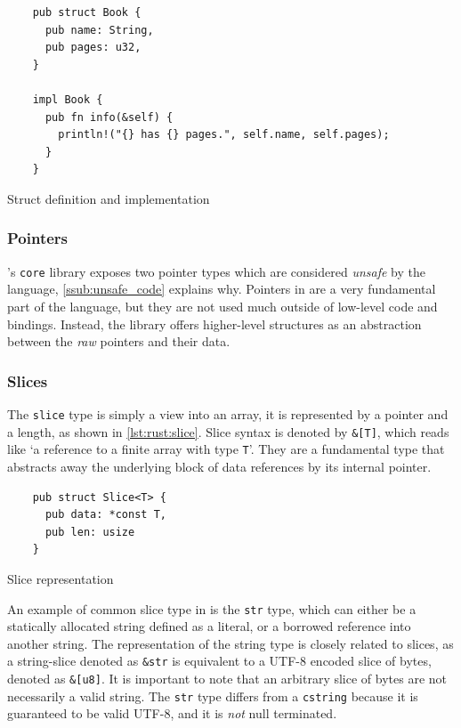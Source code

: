 \begin{listing}[H]
  \begin{verbatim}
    pub struct Book {
      pub name: String,
      pub pages: u32,
    }

    impl Book {
      pub fn info(&self) {
        println!("{} has {} pages.", self.name, self.pages);
      }
    }
  \end{verbatim}
  \caption{Struct definition and implementation}
  \label{lst:book_struct}
\end{listing}

\subsubsection{Pointers}

\rust's \texttt{core} library exposes two pointer types which are considered \textit{unsafe} by the language, \autoref{ssub:unsafe_code} explains why.
Pointers in \rust are a very fundamental part of the language, but they are not used much outside of low-level code and bindings.
Instead, the library offers higher-level structures as an abstraction between the \emph{raw} pointers and their data.

\subsubsection{Slices}

The \texttt{slice} type is simply a view into an array, it is represented by a pointer and a length, as shown in \autoref{lst:rust:slice}.
Slice syntax is denoted by \texttt{\&[T]}, which reads like `a reference to a finite array with type \texttt{T}'.
They are a fundamental type that abstracts away the underlying block of data references by its internal pointer.

\begin{listing}[H]
  \begin{verbatim}
    pub struct Slice<T> {
      pub data: *const T,
      pub len: usize
    }
\end{verbatim}
\caption{Slice representation}
\label{lst:rust:slice}
\end{listing}

An example of common slice type in \rust is the \texttt{str} type, which can either be a statically allocated string defined as a literal, or a borrowed reference into another string.
The representation of the string type is closely related to slices, as a string-slice denoted as \texttt{\&str} is equivalent to a UTF-8 encoded slice of bytes, denoted as \texttt{\&[u8]}.
It is important to note that an arbitrary slice of bytes are not necessarily a valid string.
The \texttt{str} type differs from a \texttt{cstring} because it is guaranteed to be valid UTF-8, and it is \emph{not} null terminated.

